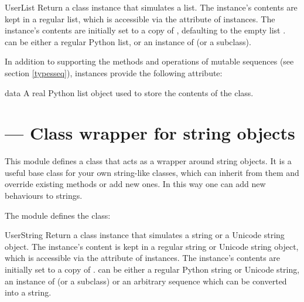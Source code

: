 \begin{classdesc}{UserList}{}
Return a class instance that simulates a list.  The instance's
contents are kept in a regular list, which is accessible via the
 attribute of  instances.  The instance's
contents are initially set to a copy of , defaulting to the
empty list \code{[]}.   can be either a regular Python list,
or an instance of  (or a subclass).
\end{classdesc}

In addition to supporting the methods and operations of mutable
sequences (see section \ref{typesseq}),  instances
provide the following attribute:

\begin{memberdesc}{data}
A real Python list object used to store the contents of the
 class.
\end{memberdesc}


\section{ ---
         Class wrapper for string objects}


This module defines a class that acts as a wrapper around
string objects.  It is a useful base class for
your own string-like classes, which can inherit from
them and override existing methods or add new ones.  In this way one
can add new behaviours to strings.

The  module defines the  class:

\begin{classdesc}{UserString}{}
Return a class instance that simulates a string or a Unicode string object.
The instance's content is kept in a regular string or Unicode string
object, which is accessible via the
 attribute of  instances.  The instance's
contents are initially set to a copy of .
 can be either a regular Python string or Unicode string,
an instance of  (or a subclass) or an arbitrary sequence
which can be converted into a string.
\end{classdesc}

